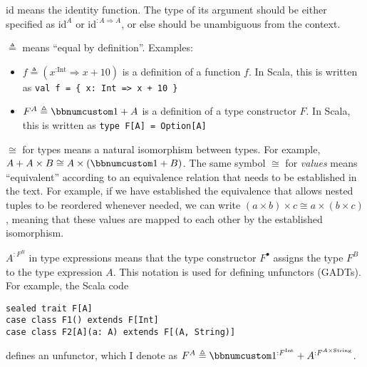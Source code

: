 $\text{id}$ means the identity function. The type of its argument
should be either specified as $\text{id}^{A}$ or $\text{id}^{:A\Rightarrow A}$,
or else should be unambiguous from the context. 

$\triangleq$ means ``equal by definition''. Examples:
\begin{itemize}
\item $f\triangleq(x^{:\text{Int}}\Rightarrow x+10)$ is a definition of
a function $f$. In Scala, this is written as \lstinline!val f = { x: Int => x + 10 }!
\item $F^{A}\triangleq\bbnum 1+A$ is a definition of a type constructor
$F$. In Scala, this is written as \lstinline!type F[A] = Option[A]!
\end{itemize}
$\cong$ for types means a natural isomorphism between types. For
example, $A+A\times B\cong A\times\left(\bbnum 1+B\right)$. The same
symbol $\cong$ for \emph{values} means ``equivalent'' according
to an equivalence relation that needs to be established in the text.
For example, if we have established the equivalence that allows nested
tuples to be reordered whenever needed, we can write $\left(a\times b\right)\times c\cong a\times\left(b\times c\right)$,
meaning that these values are mapped to each other by the established
isomorphism. 

$A^{:F^{B}}$ in type expressions means that the type constructor
$F^{\bullet}$ assigns the type $F^{B}$ to the type expression $A$.
This notation is used for defining unfunctors (GADTs). For example,
the Scala code

\begin{lstlisting}
sealed trait F[A]
case class F1() extends F[Int]
case class F2[A](a: A) extends F[(A, String)]
\end{lstlisting}
defines an unfunctor, which I denote as $F^{A}\triangleq\bbnum 1^{:F^{\text{Int}}}+A^{:F^{A\times\text{String}}}$.

